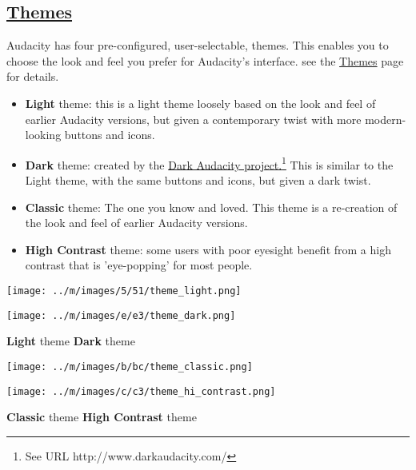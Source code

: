 \documentclass[]{book}
\begin{document}
\begin{multicols}{2}

\section{
\hyperref[themes_]{Themes}
}


Audacity has four pre-configured, user-selectable, themes.  This enables you to choose the look and feel you prefer for Audacity's interface. see the 
\hyperref[themes_]{Themes}
 page for details.
\begin{itemize}
\item \textbf{Light} theme: this is a light theme loosely based on the look and feel of earlier Audacity versions, but given a contemporary twist with more modern-looking buttons and icons. 
\item \textbf{Dark} theme: created by the 
\hyperref[http:__www.darkaudacity.com_]{Dark Audacity project.\footnote{See URL http://www.darkaudacity.com/}}
 This is similar to the Light theme, with the same buttons and icons, but given a dark twist.
\item \textbf{Classic} theme: The one you know and loved. This theme is a re-creation of the look and feel of earlier Audacity versions. 
\item \textbf{High Contrast} theme: some users with poor eyesight benefit from a high contrast that is 'eye-popping' for most people.
\end{itemize}

\* \* \* \* \par\texttt{[image: ../m/images/5/51/theme\_light.png]}\par
\* \* \* \* \par\texttt{[image: ../m/images/e/e3/theme\_dark.png]}\par
\* \* \* \* 
\textbf{Light} theme
\* \* \* \* 
\textbf{Dark} theme


\* \* \* \* \par\texttt{[image: ../m/images/b/bc/theme\_classic.png]}\par
\* \* \* \* \par\texttt{[image: ../m/images/c/c3/theme\_hi\_contrast.png]}\par
\* \* \* \* 
\textbf{Classic} theme
\* \* \* \* 
\textbf{High Contrast} theme




\end{multicols}
\end{document}
